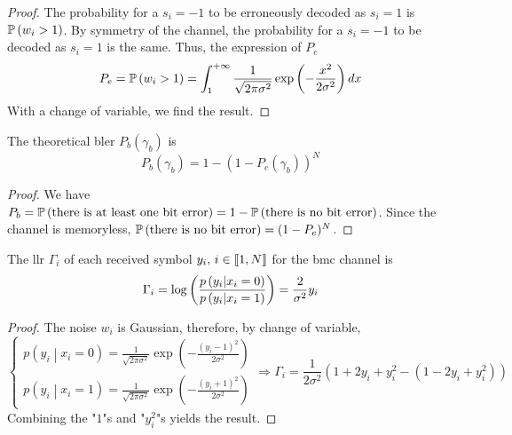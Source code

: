 \begin{proof}
    The probability for a $s_i = -1$ to be erroneously decoded as $s_i = 1$ is
    $\mathbb{P}\left( w_i > 1 \right)$. By symmetry of the channel, the probability for a $s_i =
        -1$ to be decoded as $s_i = 1$ is the same. Thus, the expression of $P_e$
    \begin{equation}
        P_e = \mathbb{P}\left( w_i > 1 \right) = \int_1^{+\infty} \frac{1}{\sqrt{2 \pi \sigma^2}} \exp\left(- \frac{x^2}{2 \sigma^2}\right) dx
    \end{equation}
    With a change of variable, we find the result.
\end{proof}

\begin{iproposition}[BLER]
    The theoretical \acrshort{bler} $P_b(\gamma_b)$ is
    \begin{equation}
        P_b(\gamma_b) = 1 - (1 - P_e(\gamma_b))^N
    \end{equation}
\end{iproposition}

\begin{proof}
    We have $P_b = \mathbb{P}\left( \text{there is at least one bit error} \right) = 1 -
        \mathbb{P}\left( \text{there is no bit error} \right)$. Since the channel is memoryless,
    $\mathbb{P}\left( \text{there is no bit error} \right) = (1 - P_e)^N$.
\end{proof}

\begin{iproposition}
    The \acrfull{llr} $\Gamma_i$ of each received symbol $y_i, \, i \in {\left\llbracket 1, N \right\rrbracket}$ for
    the \acrshort{bmc} channel is
    \begin{equation}
        \Gamma_i = \log\left( \frac{p\left(y_i \middle| x_i = 0 \right)}{p\left(y_i \middle| x_i = 1 \right)} \right)
        = \frac{2}{\sigma^2} y_i
    \end{equation}
\end{iproposition}

\begin{proof}
    The noise $w_i$ is Gaussian, therefore, by change of variable,
    \begin{equation}
        \begin{cases}
            p\left(y_i \middle| x_i = 0 \right) = \frac{1}{\sqrt{2 \pi \sigma^2}}\exp\left(-\frac{(y_i - 1)^2}{2 \sigma^2}\right) \\
            p\left(y_i \middle| x_i = 1 \right) = \frac{1}{\sqrt{2 \pi \sigma^2}}\exp\left(-\frac{(y_i + 1)^2}{2 \sigma^2}\right)
        \end{cases}
        \Rightarrow \Gamma_i = \frac{1}{2 \sigma^2} \left(1 + 2 y_i + y_i^2 - (1 - 2 y_i + y_i ^2)\right)
    \end{equation}
    Combining the "$1$"s and "$y_i^2$"s yields the result.
\end{proof}

